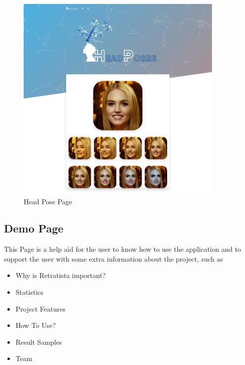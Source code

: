 \begin{figure}[H]
    \centering
    \includegraphics[width=0.9\textwidth]{images/guide/poses.png}
    \caption{Head Pose Page}
    \label{fig:user-poses}
\end{figure}


\subsection{Demo Page}
This Page is a help aid for the user to know how to use the application and to support the user with some extra information about the project, such as
\begin{itemize}
    \item Why is Retratista important?
    \item Statistics
    \item Project Features
    \item How To Use?
    \item Result Samples
    \item Team
\end{itemize}
